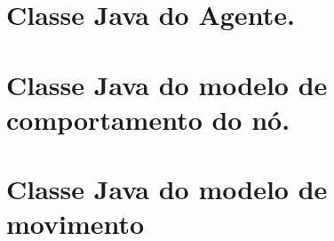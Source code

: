 \documentclass{uflamon-22}          %
\begin{document}

\renewcommand{\appendixtocname}{Anexos}
\renewcommand{\appendixpagename}{Anexos}
   
\newpage 

\begin{appendices}
  \chapter{Classe Java do Agente.}
  \label{app:agente}
  

  \chapter{Classe Java do modelo de comportamento do nó.}
  \label{app:comportamentoNo}
  


  \chapter{Classe Java do modelo de movimento}
  \label{app:movimento}
  
\end{appendices}



\end{document}

